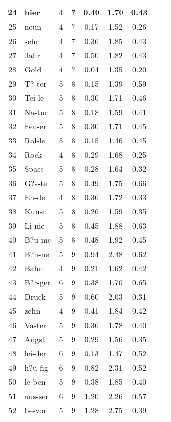 {\begin{longtable}{clccccccc}
24 & hier & 4 & 7 & 0.40 & 1.70 & 0.43 \\ \hline
25 & neun & 4 & 7 & 0.17 & 1.52 & 0.26 \\ \hline
26 & sehr & 4 & 7 & 0.36 & 1.85 & 0.43 \\ \hline
27 & Jahr & 4 & 7 & 0.50 & 1.82 & 0.43 \\ \hline
28 & Gold & 4 & 7 & 0.04 & 1.35 & 0.20 \\ \hline
29 & T?-ter & 5 & 8 & 0.15 & 1.39 & 0.59 \\ \hline
30 & Tei-le & 5 & 8 & 0.30 & 1.71 & 0.46 \\ \hline
31 & Na-tur & 5 & 8 & 0.18 & 1.59 & 0.41 \\ \hline
32 & Feu-er & 5 & 8 & 0.30 & 1.71 & 0.45 \\ \hline
33 & Rol-le & 5 & 8 & 0.15 & 1.46 & 0.45 \\ \hline
34 & Rock & 4 & 8 & 0.29 & 1.68 & 0.25 \\ \hline
35 & Spass & 5 & 8 & 0.28 & 1.64 & 0.32 \\ \hline
36 & G?s-te & 5 & 8 & 0.49 & 1.75 & 0.66 \\ \hline
37 & En-de & 4 & 8 & 0.36 & 1.72 & 0.33 \\ \hline
38 & Kunst & 5 & 8 & 0.26 & 1.59 & 0.35 \\ \hline
39 & Li-nie & 5 & 8 & 0.45 & 1.88 & 0.63 \\ \hline
40 & B?u-me & 5 & 8 & 0.48 & 1.92 & 0.45 \\ \hline
41 & B?h-ne & 5 & 9 & 0.94 & 2.48 & 0.62 \\ \hline
42 & Bahn & 4 & 9 & 0.21 & 1.62 & 0.42 \\ \hline
43 & B?r-ger & 6 & 9 & 0.38 & 1.70 & 0.65 \\ \hline
44 & Druck & 5 & 9 & 0.60 & 2.03 & 0.31 \\ \hline
45 & zehn & 4 & 9 & 0.41 & 1.84 & 0.42 \\ \hline
46 & Va-ter & 5 & 9 & 0.36 & 1.78 & 0.40 \\ \hline
47 & Angst & 5 & 9 & 0.29 & 1.56 & 0.35 \\ \hline
48 & lei-der & 6 & 9 & 0.13 & 1.47 & 0.52 \\ \hline
49 & h?u-fig & 6 & 9 & 0.82 & 2.31 & 0.52 \\ \hline
50 & le-ben & 5 & 9 & 0.38 & 1.85 & 0.40 \\ \hline
51 & aus-ser & 6 & 9 & 1.20 & 2.26 & 0.57 \\ \hline
52 & be-vor & 5 & 9 & 1.28 & 2.75 & 0.39 \\ \hline

\end{longtable}}
